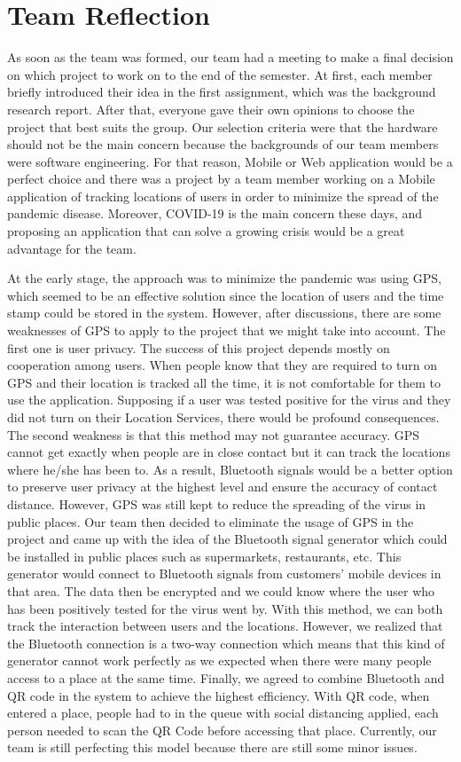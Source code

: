 \section{Team Reflection}
  \par As soon as the team was formed, our team had a meeting to make a final decision on which project to work on to the end of the semester. At first, each member briefly introduced their idea in the first assignment, which was the background research report. After that, everyone gave their own opinions to choose the project that best suits the group. Our selection criteria were that the hardware should not be the main concern because the backgrounds of our team members were software engineering. For that reason, Mobile or Web application would be a perfect choice and there was a project by a team member working on a Mobile application of tracking locations of users in order to minimize the spread of the pandemic disease. Moreover, COVID-19 is the main concern these days, and proposing an application that can solve a growing crisis would be a great advantage for the team.
  \par At the early stage, the approach was to minimize the pandemic was using GPS, which seemed to be an effective solution since the location of users and the time stamp could be stored in the system. However, after discussions, there are some weaknesses of GPS to apply to the project that we might take into account. The first one is user privacy. The success of this project depends mostly on cooperation among users. When people know that they are required to turn on GPS and their location is tracked all the time, it is not comfortable for them to use the application. Supposing if a user was tested positive for the virus and they did not turn on their Location Services, there would be profound consequences. The second weakness is that this method may not guarantee accuracy. GPS cannot get exactly when people are in close contact but it can track the locations where he/she has been to. As a result, Bluetooth signals would be a better option to preserve user privacy at the highest level and ensure the accuracy of contact distance. However, GPS was still kept to reduce the spreading of the virus in public places. Our team then decided to eliminate the usage of GPS in the project and came up with the idea of the Bluetooth signal generator which could be installed in public places such as supermarkets, restaurants, etc. This generator would connect to Bluetooth signals from customers’ mobile devices in that area. The data then be encrypted and we could know where the user who has been positively tested for the virus went by. With this method, we can both track the interaction between users and the locations. However, we realized that the Bluetooth connection is a two-way connection which means that this kind of generator cannot work perfectly as we expected when there were many people access to a place at the same time. Finally, we agreed to combine Bluetooth and QR code in the system to achieve the highest efficiency. With QR code, when entered a place, people had to in the queue with social distancing applied, each person needed to scan the QR Code before accessing that place. Currently, our team is still perfecting this model because there are still some minor issues.
